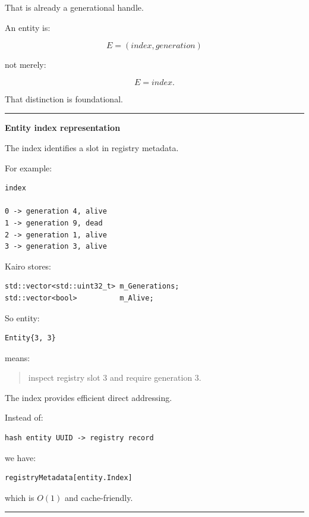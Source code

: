 That is already a generational handle.

An entity is:

\[
\boxed{
E=(index,generation)
}
\]

not merely:

\[
E=index.
\]

That distinction is foundational.

\begin{center}\rule{0.5\linewidth}{0.5pt}\end{center}

\textbf{Entity index representation}

The index identifies a slot in registry metadata.

For example:

\begin{verbatim}
index

0 -> generation 4, alive
1 -> generation 9, dead
2 -> generation 1, alive
3 -> generation 3, alive
\end{verbatim}

Kairo stores:

\begin{verbatim}
std::vector<std::uint32_t> m_Generations;
std::vector<bool>          m_Alive;
\end{verbatim}

So entity:

\begin{verbatim}
Entity{3, 3}
\end{verbatim}

means:

\begin{quote}
inspect registry slot 3 and require generation 3.
\end{quote}

The index provides efficient direct addressing.

Instead of:

\begin{verbatim}
hash entity UUID -> registry record
\end{verbatim}

we have:

\begin{verbatim}
registryMetadata[entity.Index]
\end{verbatim}

which is \(O(1)\) and cache-friendly.

\begin{center}\rule{0.5\linewidth}{0.5pt}\end{center}

